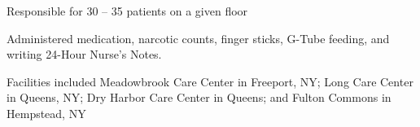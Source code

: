 \documentclass[]{deedy-resume-openfont}
\begin{document}
\begin{minipage}[t]{0.66\textwidth}
\begin{tightemize}
\end{tightemize}
\sectionsep


\begin{tightemize}


\item Responsible for 30 – 35 patients on a given floor

\item Administered medication, narcotic counts, finger sticks, G-Tube feeding, and writing 24-Hour Nurse’s Notes.

\item Facilities included Meadowbrook Care Center in Freeport, NY; Long Care Center in Queens, NY; Dry Harbor Care Center in Queens; and Fulton Commons in Hempstead, NY

\end{tightemize}
\sectionsep





% 

% 


\end{minipage} 
\end{document}
